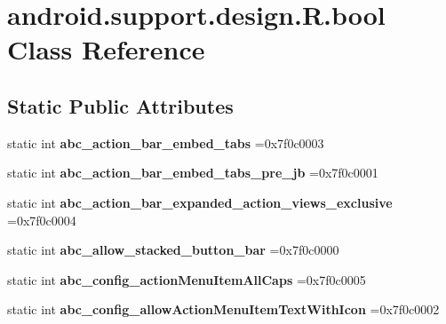 \hypertarget{classandroid_1_1support_1_1design_1_1R_1_1bool}{}\section{android.\+support.\+design.\+R.\+bool Class Reference}
\label{classandroid_1_1support_1_1design_1_1R_1_1bool}
\subsection*{Static Public Attributes}
\begin{DoxyCompactItemize}
\item 
\mbox{\label{classandroid_1_1support_1_1design_1_1R_1_1bool_a7b86958b0ef6c0f4ed131d0434583529}} 
static int {\bfseries abc\+\_\+action\+\_\+bar\+\_\+embed\+\_\+tabs} =0x7f0c0003
\item 
\mbox{\label{classandroid_1_1support_1_1design_1_1R_1_1bool_ae34d0d2ed31ce1bb98037c48ed21eb62}} 
static int {\bfseries abc\+\_\+action\+\_\+bar\+\_\+embed\+\_\+tabs\+\_\+pre\+\_\+jb} =0x7f0c0001
\item 
\mbox{\label{classandroid_1_1support_1_1design_1_1R_1_1bool_a80c0acf4096c29baed16e44663c472db}} 
static int {\bfseries abc\+\_\+action\+\_\+bar\+\_\+expanded\+\_\+action\+\_\+views\+\_\+exclusive} =0x7f0c0004
\item 
\mbox{\label{classandroid_1_1support_1_1design_1_1R_1_1bool_ac11c6917969d35715b26c8d11efe2020}} 
static int {\bfseries abc\+\_\+allow\+\_\+stacked\+\_\+button\+\_\+bar} =0x7f0c0000
\item 
\mbox{\label{classandroid_1_1support_1_1design_1_1R_1_1bool_a3b9ff2aad0b597c7deb0274d3b0b9c2a}} 
static int {\bfseries abc\+\_\+config\+\_\+action\+Menu\+Item\+All\+Caps} =0x7f0c0005
\item 
\mbox{\label{classandroid_1_1support_1_1design_1_1R_1_1bool_a80679629e4948b6cd701b62bceaab640}} 
static int {\bfseries abc\+\_\+config\+\_\+allow\+Action\+Menu\+Item\+Text\+With\+Icon} =0x7f0c0002

\end{DoxyCompactItemize}
